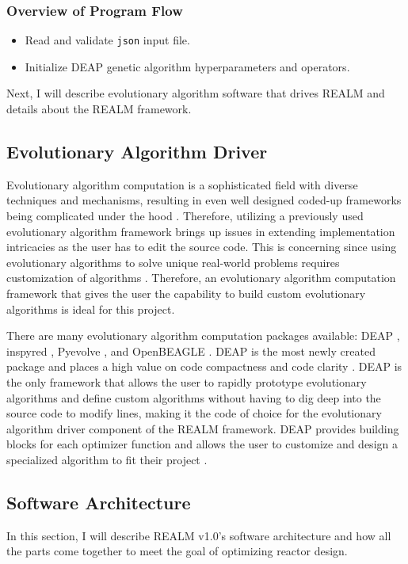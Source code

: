 \subsubsection{Overview of Program Flow}
\begin{itemize}
    \item Read and validate \texttt{json} input file.
    \item Initialize DEAP genetic algorithm hyperparameters and operators. 
\end{itemize}

Next, I will describe evolutionary algorithm software that drives \gls{REALM} 
and details about the \gls{REALM} framework. 

\subsection{Evolutionary Algorithm Driver}
Evolutionary algorithm computation is a sophisticated field with diverse techniques 
and mechanisms, resulting in even well designed coded-up frameworks being complicated 
under the hood \cite{fortin_deap_2012}. 
Therefore, utilizing a previously used evolutionary algorithm framework brings 
up issues in extending implementation intricacies as the user has to edit the 
source code. 
This is concerning since using evolutionary algorithms to solve unique real-world 
problems requires customization of algorithms \cite{fortin_deap_2012}. 
Therefore, an evolutionary algorithm computation framework that gives the user the 
capability to build custom evolutionary algorithms is ideal for this project.

There are many evolutionary algorithm computation packages available: 
\gls{DEAP} \cite{fortin_deap_2012}, inspyred \cite{garrett_inspyred_2014}, 
Pyevolve \cite{perone_pyevolve_2009}, and OpenBEAGLE \cite{gagne_open_2002}.
\gls{DEAP} is the most newly created package and places a high value on code 
compactness and code clarity \cite{fortin_deap_2012}. 
\gls{DEAP} is the only framework that allows the user to rapidly prototype 
evolutionary algorithms and define custom algorithms without having to dig 
deep into the source code to modify lines,  making it the code of choice for 
the evolutionary algorithm driver component of the \gls{REALM} framework.  
\gls{DEAP} provides building blocks for each optimizer function and allows the 
user to customize and design a specialized algorithm to fit their project
\cite{fortin_deap_2012}.

\subsection{Software Architecture}
In this section, I will describe \gls{REALM} v1.0's software architecture and 
how all the parts come together to meet the goal of optimizing reactor 
design. 

